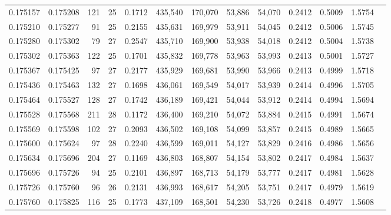 \begin{tabular}{rrrrrrrrrrrrr}
0.175157 & 0.175208 & 121 &  25 &                                     0.1712 & 435,540 & 170,070 &  53,886 &  54,070 & 0.2412 & 0.5009 & 1.5754 \\
0.175210 & 0.175277 &  91 &  25 &                                     0.2155 & 435,631 & 169,979 &  53,911 &  54,045 & 0.2412 & 0.5006 & 1.5745 \\
0.175280 & 0.175302 &  79 &  27 &                                     0.2547 & 435,710 & 169,900 &  53,938 &  54,018 & 0.2412 & 0.5004 & 1.5738 \\
0.175302 & 0.175363 & 122 &  25 &                                     0.1701 & 435,832 & 169,778 &  53,963 &  53,993 & 0.2413 & 0.5001 & 1.5727 \\
0.175367 & 0.175425 &  97 &  27 &                                     0.2177 & 435,929 & 169,681 &  53,990 &  53,966 & 0.2413 & 0.4999 & 1.5718 \\
0.175436 & 0.175463 & 132 &  27 &                                     0.1698 & 436,061 & 169,549 &  54,017 &  53,939 & 0.2414 & 0.4996 & 1.5705 \\
0.175464 & 0.175527 & 128 &  27 &                                     0.1742 & 436,189 & 169,421 &  54,044 &  53,912 & 0.2414 & 0.4994 & 1.5694 \\
0.175528 & 0.175568 & 211 &  28 &                                     0.1172 & 436,400 & 169,210 &  54,072 &  53,884 & 0.2415 & 0.4991 & 1.5674 \\
0.175569 & 0.175598 & 102 &  27 &                                     0.2093 & 436,502 & 169,108 &  54,099 &  53,857 & 0.2415 & 0.4989 & 1.5665 \\
0.175600 & 0.175624 &  97 &  28 &                                     0.2240 & 436,599 & 169,011 &  54,127 &  53,829 & 0.2416 & 0.4986 & 1.5656 \\
0.175634 & 0.175696 & 204 &  27 &                                     0.1169 & 436,803 & 168,807 &  54,154 &  53,802 & 0.2417 & 0.4984 & 1.5637 \\
0.175696 & 0.175726 &  94 &  25 &                                     0.2101 & 436,897 & 168,713 &  54,179 &  53,777 & 0.2417 & 0.4981 & 1.5628 \\
0.175726 & 0.175760 &  96 &  26 &                                     0.2131 & 436,993 & 168,617 &  54,205 &  53,751 & 0.2417 & 0.4979 & 1.5619 \\
0.175760 & 0.175825 & 116 &  25 &                                     0.1773 & 437,109 & 168,501 &  54,230 &  53,726 & 0.2418 & 0.4977 & 1.5608 \\

\end{tabular}
